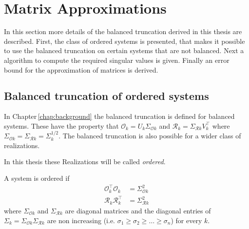 \documentclass[doctype=mastersthesis,BCOR=15mm,biblatex]{ldvbook}%
\DeclareMathOperator{\diag}{diag}
\newcommand{\R}{\mathcal{R}} %
\newcommand{\Ob}{\mathcal{O}} %
\begin{document}
\section{Matrix Approximations}\label{sec:approx}

In this section more details of the balanced truncation derived in this thesis are described.
First, the class of ordered systems is presented, that makes it possible to use the balanced truncation on certain systems that are not balanced.
Next a algorithm to compute the required singular values is given.
Finally an error bound for the approximation of matrices is derived.

\subsection{Balanced truncation of ordered systems}
In Chapter\,\ref{chap:background} the balanced truncation is defined for balanced systems.
These have the property that $\Ob_k = U_k \Sigma_{\Ob k}$ and $\R_k = \Sigma_{\R k} V_k^\top$ where $\Sigma_{\Ob k} = \Sigma_{\R k}=\Sigma_k^{1/2}$.
The balanced truncation is also possible for a wider class of realizations.

In this thesis these Realizations will be called  \emph{ordered}.
\begin{definition}
	A system is ordered if 
	\begin{subequations}
	\begin{align}
		\Ob_k^\top \Ob_k &= \Sigma_ {\Ob k}^2 \label{eq:orderd_obs}\\ %
		\R_k \R_k^\top &= \Sigma_ {\R k}^2 \label{eq:orderd_reach}%
	\end{align}
	\end{subequations}
	where $\Sigma_{\Ob k}$ and $\Sigma_{\R k}$ are diagonal matrices
	and the diagonal entries of $\Sigma_k =\Sigma_{\Ob k}\Sigma_{\R k}$ are non increasing (i.e. $\sigma_1 \geq \sigma_2 \geq \dots \geq \sigma_n$)
    for every $k$.
\end{definition}

\end{document}
